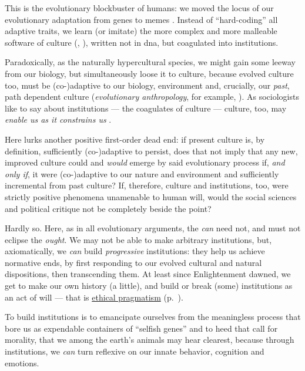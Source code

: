 This is the evolutionary blockbuster of humans:
we moved the locus of our evolutionary adaptation from genes to memes \citep{Dawkins1976}.
Instead of ``hard-coding'' all adaptive traits, we learn (or imitate) the more complex and more malleable software of culture (\citealt{Boyd1985}, \citealt[K196ff]{Henrich2007}), written not in \gls{dna}, but coagulated into institutions.

Paradoxically, as the naturally hypercultural species, we might gain some leeway from our biology, but simultaneously loose it to culture, because evolved culture too, must be (co-)adaptive to our biology, environment and, crucially, our \emph{past}, path dependent culture (\emph{evolutionary anthropology}, for example, \citealt{Wright2000}).
As sociologists like to say about institutions --- the coagulates of culture --- culture, too, may \emph{enable us as it constrains us} \citep[for example,][3]{Hodgson2006}.

Here lurks another positive first-order dead end:
if present culture is, by definition, sufficiently (co-)adaptive to persist, does that not imply that any new, improved culture could and \emph{would} emerge by said evolutionary process if, \emph{and only if}, it were (co-)adaptive to our nature and environment and sufficiently incremental from past culture?
If, therefore, culture and institutions, too, were strictly positive phenomena unamenable to human will, would the social sciences and political critique not be completely beside the point? %

Hardly so.
Here, as in all evolutionary arguments, the \emph{can} need not, and must not eclipse the \emph{ought}.
We may not be able to make arbitrary institutions, but, axiomatically, we \emph{can} build \emph{progressive} institutions:
they help us achieve normative ends, by first responding to our evolved cultural and natural dispositions, then transcending them.
At least since Enlightenment dawned, we get to make our own history (a little), and build or break (some) institutions as an act of will --- that is \hyperref[itm:pragmatic-ethics]{ethical pragmatism} (p.~\pageref{itm:pragmatic-ethics}).

To build institutions is to emancipate ourselves from the meaningless process that bore us as expendable containers of ``selfish genes'' \citep{Dawkins1976} and to heed that call for morality, that we among the earth's animals may hear clearest, because through institutions, we \emph{can} turn reflexive on our innate behavior, cognition and emotions.


